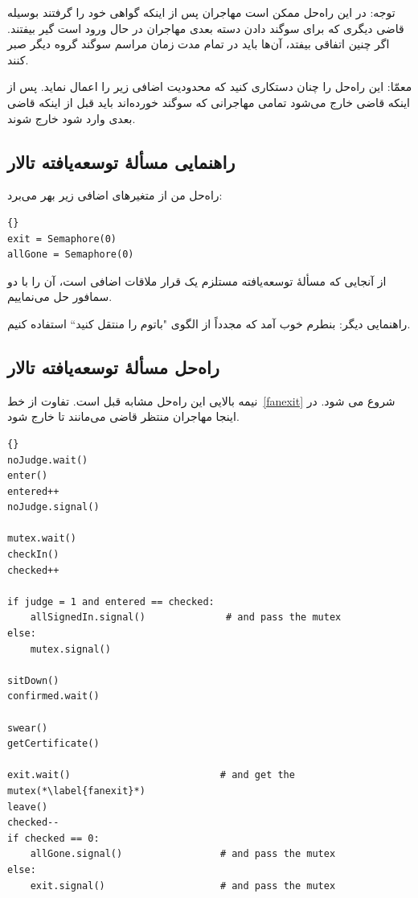 \documentclass{book}
\newcommand{\clearemptydoublepage}{}%
\begin{document}
    توجه: در این راه‌حل ممکن است مهاجران پس از اینکه گواهی خود را گرفتند بوسیله قاضی‌ دیگری که برای سوگند دادن دسته بعدی 
    مهاجران در حال ورود است گیر بیفتند. اگر چنین اتفاقی بیفتد، آن‌ها باید در تمام مدت زمان مراسم سوگند گروه دیگر صبر کنند. 

    معمّا: این راه‌حل را چنان دستکاری کنید که محدودیت اضافی زیر را اعمال نماید. پس از اینکه قاضی خارج می‌شود تمامی مهاجرانی که سوگند خورده‌اند 
    باید قبل از اینکه قاضی بعدی وارد شود خارج شوند. 

   
\clearemptydoublepage
\subsection{راهنمایی مسألهٔ توسعه‌یافته تالار }

    راه‌حل من از متغیرهای اضافی زیر بهر می‌برد:‌

\begin{latin}
\begin{lstlisting}[title=\rl{راهنمایی مسألهٔ تالار \lr{Faneuil}}]{}
exit = Semaphore(0)
allGone = Semaphore(0)
\end{lstlisting}
\end{latin}

    از آنجایی که مسألهٔ توسعه‌یافته مستلزم یک قرار ملاقات اضافی است،‌ آن را با دو سمافور حل می‌نماییم. 

    راهنمایی دیگر: بنطرم خوب آمد که مجدداً از الگوی "باتوم را منتقل کنید`` استفاده کنیم. 


\clearemptydoublepage
\subsection{راه‌حل مسألهٔ توسعه‌یافته تالار }

    نیمه بالایی این راه‌حل مشابه قبل است. تفاوت از خط~\ref{fanexit} شروع می شود. در اینجا مهاجران منتظر قاضی می‌مانند تا خارج شود. 

\begin{latin}
\begin{lstlisting}[title=\rl{راهنمایی مسألهٔ تالار \lr{Faneuil} (مهاجر)}]{}
noJudge.wait()
enter()
entered++
noJudge.signal()

mutex.wait()
checkIn()
checked++

if judge = 1 and entered == checked:
    allSignedIn.signal()              # and pass the mutex
else:
    mutex.signal()

sitDown()
confirmed.wait()

swear()
getCertificate()

exit.wait()                          # and get the mutex(*\label{fanexit}*)
leave()
checked--
if checked == 0:
    allGone.signal()                 # and pass the mutex
else:
    exit.signal()                    # and pass the mutex
\end{lstlisting}
\end{latin}
\end{document}
